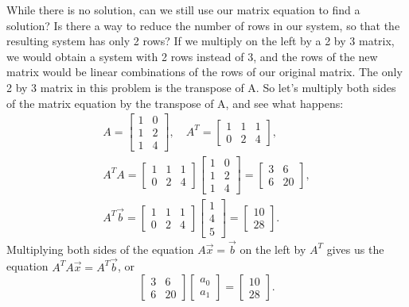 \begin{example}
While there is no solution, can we still use our matrix equation to find a solution? 
Is there a way to reduce the number of rows in our system, so that the resulting system has only 2 rows? 
If we multiply on the left by a 2 by 3 matrix, we would obtain a system with 2 rows instead of 3, and the rows of the new matrix would be linear combinations of the rows of our original matrix.  
The only 2 by 3 matrix in this problem is the transpose of A.  
So let's multiply both sides of the matrix equation by the transpose of A, and see what happens:
\begin{gather*}
A = \begin{bmatrix}1&0\\1&2\\1&4\end{bmatrix}, \quad
A^T = \begin{bmatrix}1&1&1\\0&2&4\end{bmatrix},\\
A^T A =\begin{bmatrix}1&1&1\\0&2&4\end{bmatrix}\begin{bmatrix}1&0\\1&2\\1&4\end{bmatrix}= \begin{bmatrix}3&6\\6&20\end{bmatrix},\\%
A^T\vec b =  \begin{bmatrix}1&1&1\\0&2&4\end{bmatrix}\begin{bmatrix}1\\4\\5\end{bmatrix} = \begin{bmatrix}10\\28\end{bmatrix}.
\end{gather*}
%
Multiplying both sides of the equation $A\vec x = \vec b$ on the left by $A^T$ gives us the equation 
$A^T A \vec x = A^T\vec b$, or 
$$\begin{bmatrix}3&6\\6&20\end{bmatrix} \begin{bmatrix}a_0\\a_1\end{bmatrix}=\begin{bmatrix}10\\28\end{bmatrix}.$$ 

\end{example}
